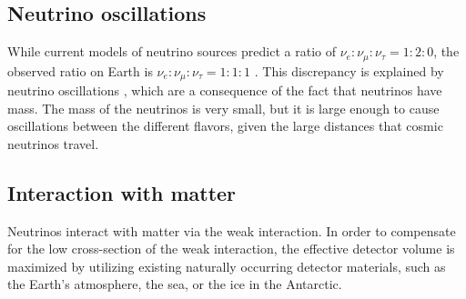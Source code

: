 \subsection{Neutrino oscillations}
While current models of neutrino sources predict a ratio of
  $\nu_e : \nu_\mu : \nu_\tau = 1 : 2 : 0$,
the observed ratio on Earth is
  $\nu_e : \nu_\mu : \nu_\tau = 1 : 1 : 1$ \citationneeded{}.
This discrepancy is explained by neutrino oscillations \cite{neutrinos_beacom},
  which are a consequence of the fact that neutrinos have mass.
The mass of the neutrinos is very small,
  but it is large enough to cause oscillations between the different flavors,
    given the large distances that cosmic neutrinos travel.


\subsection{Interaction with matter}
Neutrinos interact with matter via the weak interaction.
In order to compensate for the low cross-section of the weak interaction,
  the effective detector volume is maximized by utilizing existing naturally occurring detector materials,
  such as
    the Earth's atmosphere,
    the sea,
    or the ice in the Antarctic.

